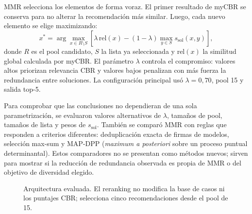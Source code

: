 \documentclass[11pt,a4paper]{article}
\newcommand{\OPMAD}{\textsc{opmad}}
\newcommand{\OntoCast}{\textsc{OntoCast}}
\newcommand{\myCBR}{myCBR}
\begin{document}
MMR selecciona los elementos de forma voraz. El primer resultado de \myCBR{} se conserva para no alterar la recomendación más similar. Luego, cada nuevo elemento se elige maximizando:
\begin{equation}
 x^{*}=\arg\max_{x\in R\setminus S}\left[\lambda\,\mathrm{rel}(x)-(1-\lambda)\max_{y\in S}s_{\mathrm{sol}}(x,y)\right],
 \label{eq:mmr}
\end{equation}
donde $R$ es el pool candidato, $S$ la lista ya seleccionada y $\mathrm{rel}(x)$ la similitud global calculada por \myCBR{}. El parámetro $\lambda$ controla el compromiso: valores altos priorizan relevancia CBR y valores bajos penalizan con más fuerza la redundancia entre soluciones. La configuración principal usó $\lambda=0{,}70$, pool 15 y salida top-5.

Para comprobar que las conclusiones no dependieran de una sola parametrización, se evaluaron valores alternativos de $\lambda$, tamaños de pool, tamaños de lista y pesos de $s_{\mathrm{sol}}$. También se comparó MMR con reglas que responden a criterios diferentes: deduplicación exacta de firmas de modelos, selección max-sum y MAP-DPP (\emph{maximum a posteriori} sobre un proceso puntual determinantal). Estos comparadores no se presentan como métodos nuevos; sirven para mostrar si la reducción de redundancia observada es propia de MMR o del objetivo de diversidad elegido.

\begin{figure}[H]
\centering
{}
\caption{Arquitectura evaluada. El reranking no modifica la base de casos ni los puntajes CBR; selecciona cinco recomendaciones desde el pool de 15.}
\label{fig:architecture}
\end{figure}
\end{document}
